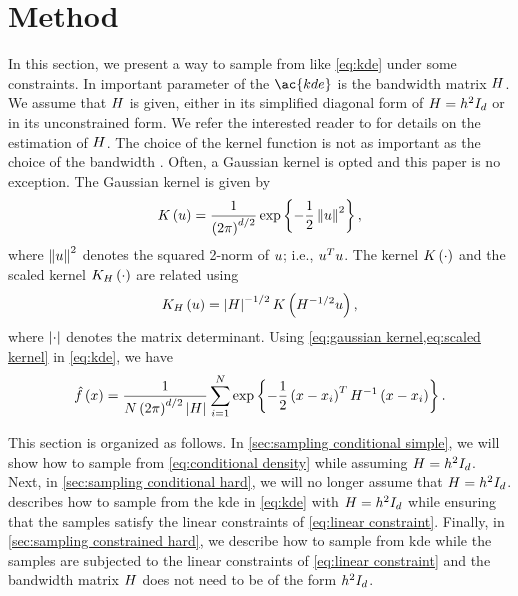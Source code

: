 \section{Method}
\label{sec:method}

In this section, we present a way to sample from  like \cref{eq:kde} under some constraints. 
In important parameter of the $\ac{kde}$ is the bandwidth matrix $H$. 
We assume that $H$ is given, either in its simplified diagonal form of $H=h^2 I_{d}$ or in its unconstrained form.
We refer the interested reader to \autocite{turlach1993bandwidthselection, jones1996brief, duong2007ks, gramacki2017fft} for details on the estimation of $H$.
The choice of the kernel function is not as important as the choice of the bandwidth \autocite{turlach1993bandwidthselection}.
Often, a Gaussian kernel is opted and this paper is no exception.
The Gaussian kernel is given by
\begin{equation}
	\label{eq:gaussian kernel}
	K \left( u \right) = \frac{1}{\left(2 \pi \right)^{d/2}} \exp\left\{  -\frac{1}{2} \left\Vert u \right\Vert^2 \right\},
\end{equation}
where $\left\Vert u \right\Vert^2$ denotes the squared 2-norm of $u$; i.e., $u^T u$.
The kernel $K \left( \cdot \right)$ and the scaled kernel $K_{H} \left( \cdot \right)$ are related using
\begin{equation}
	\label{eq:scaled kernel}
	K_{H} \left( u \right)
	= \left| H \right|^{-1/2} K \left(  H^{-1/2} u  \right),
\end{equation}
where $\left| \cdot \right|$ denotes the matrix determinant.
Using \cref{eq:gaussian kernel,eq:scaled kernel} in \cref{eq:kde}, we have
\begin{equation}
	\label{eq:gaussian kde}
	\hat{f}\left( x \right)
	= \frac{1}{N \left(2\pi\right)^{d/2} \left| H \right|}
	\sum_{i=1}^{N} 
	\exp\left\{ -\frac{1}{2} \left( x - x_{i} \right)^T H^{-1} \left( x - x_{i} \right) \right\}.
\end{equation}

This section is organized as follows.
In \cref{sec:sampling conditional simple}, we will show how to sample from \cref{eq:conditional density} while assuming $H=h^2 I_{d}$.
Next, in \cref{sec:sampling conditional hard}, we will no longer assume that $H=h^2 I_{d}$.
 describes how to sample from the \ac{kde} in \cref{eq:kde} with $H=h^2 I_{d}$ while ensuring that the samples satisfy the linear constraints of \cref{eq:linear constraint}.
Finally, in \cref{sec:sampling constrained hard}, we describe how to sample from \ac{kde} while the samples are subjected to the linear constraints of \cref{eq:linear constraint} and the bandwidth matrix $H$ does not need to be of the form $h^2 I_{d}$.




